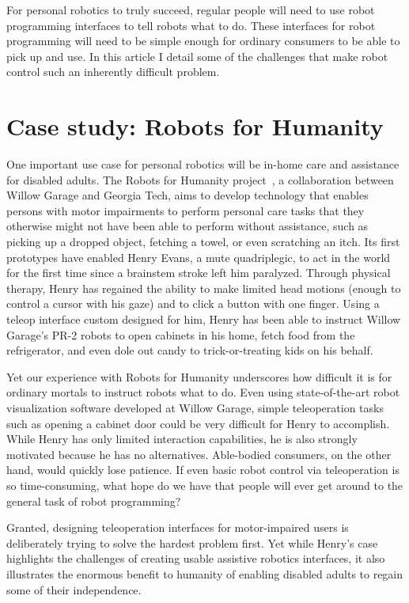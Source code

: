 \documentclass[10pt,twocolumn]{article}
\begin{document}
For personal robotics to truly succeed, regular people will need to use robot programming interfaces to tell robots what to do. These interfaces for robot programming will need to be simple enough for ordinary consumers to be able to pick up and use. In this article I detail some of the challenges that make robot control such an inherently difficult problem.

\section{Case study: Robots for Humanity}

One important use case for personal robotics will be in-home care and assistance for disabled adults. The Robots for Humanity project~\cite{rfh}, a collaboration between Willow Garage and Georgia Tech, aims to develop technology that enables persons with motor impairments to perform personal care tasks that they otherwise might not have been able to perform without assistance, such as picking up a dropped object, fetching a towel, or even scratching an itch. Its first prototypes have enabled Henry Evans, a mute quadriplegic, to act in the world for the first time since a brainstem stroke left him paralyzed. Through physical therapy, Henry has regained the ability to make limited head motions (enough to control a cursor with his gaze) and to click a button with one finger.  Using a teleop interface custom designed for him, Henry has been able to instruct Willow Garage's PR-2 robots to open cabinets in his home, fetch food from the refrigerator, and even dole out candy to trick-or-treating kids on his behalf.

Yet our experience with Robots for Humanity underscores how difficult it is for ordinary mortals to instruct robots what to do. Even using state-of-the-art robot visualization software developed at Willow Garage, simple teleoperation tasks such as opening a cabinet door could be very difficult for Henry to accomplish. While Henry has only limited interaction capabilities, he is also strongly motivated because he has no alternatives. Able-bodied consumers, on the other hand, would quickly lose patience. If even basic robot control via teleoperation is so time-consuming, what hope do we have that people will ever get around to the general task of robot programming?

Granted, designing teleoperation interfaces for motor-impaired users is deliberately trying to solve the hardest problem first.  Yet while Henry's case highlights the challenges of creating usable assistive robotics interfaces, it also illustrates the enormous benefit to humanity of enabling disabled adults to regain some of their independence.
\end{document}
